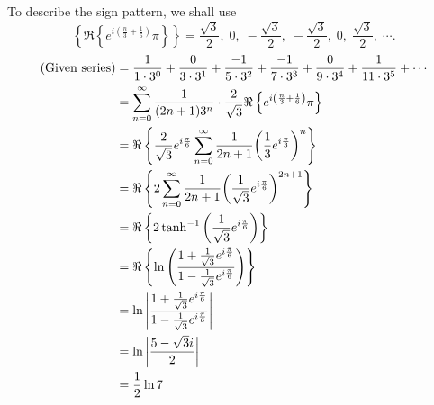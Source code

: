 \item

To describe the sign pattern, we shall use
\[
	\left\{ \Re \left\{ e^{i \left( \frac{n}{3} + \frac{1}{6} \right)} \pi \right\} \right\}
	= \frac{\sqrt{3}}{2},\; 0,\; -\frac{\sqrt{3}}{2},\; -\frac{\sqrt{3}}{2},\; 0,\; \frac{\sqrt{3}}{2},\; \cdots.
\]
\begin{align*}
	(\text{Given series})
	&= \frac{1}{1 \cdot 3^0} + \frac{0}{3 \cdot 3^1} + \frac{-1}{5 \cdot 3^2} + \frac{-1}{7 \cdot 3^3} + \frac{0}{9 \cdot 3^4} + \frac{1}{11 \cdot 3^5} + \cdots \\
	&= \sum_{n = 0}^\infty \frac{1}{(2n + 1) 3^n} \cdot \frac{2}{\sqrt{3}} \Re \left\{ e^{i \left( \frac{n}{3} + \frac{1}{6} \right)} \pi \right\} \\
	&= \Re \left\{ \frac{2}{\sqrt{3}} e^{i \frac{\pi}{6}} \sum_{n = 0}^\infty \frac{1}{2n + 1} {\left( \frac{1}{3} e^{i \frac{\pi}{3}} \right)}^n \right\} \\
	&= \Re \left\{ 2 \sum_{n = 0}^\infty \frac{1}{2n + 1} {\left( \frac{1}{\sqrt{3}} e^{i \frac{\pi}{6}} \right)}^{2n + 1} \right\} \\
	&= \Re \left\{ 2 \tanh^{-1} \left( \frac{1}{\sqrt{3}} e^{i\frac{\pi}{6}} \right) \right\} \\
	&= \Re \left\{ \ln \left( \frac{1 + \frac{1}{\sqrt{3}} e^{i\frac{\pi}{6}}}{1 - \frac{1}{\sqrt{3}} e^{i\frac{\pi}{6}}} \right) \right\} \\
	&= \ln \left| \frac{1 + \frac{1}{\sqrt{3}} e^{i\frac{\pi}{6}}}{1 - \frac{1}{\sqrt{3}} e^{i\frac{\pi}{6}}} \right| \\
	&= \ln \left| \frac{5 - \sqrt{3} i}{2} \right| \\
	&= \frac{1}{2} \ln 7
\end{align*}

